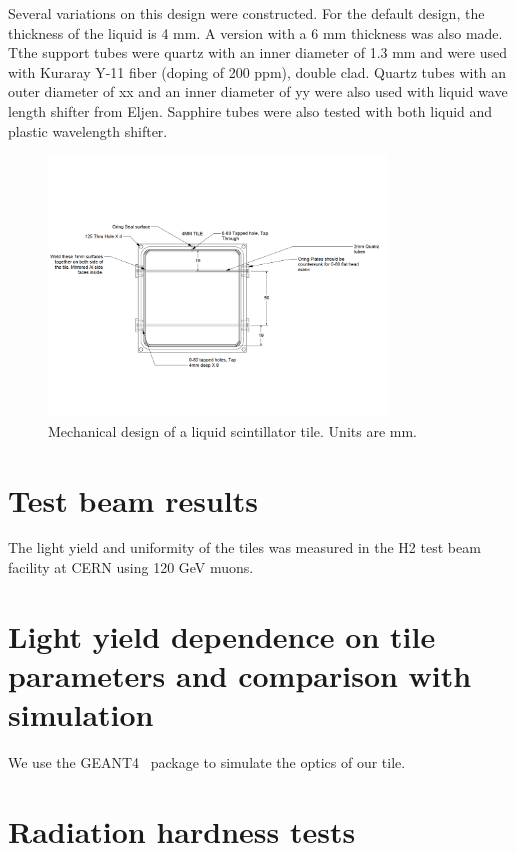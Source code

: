 \documentclass[review]{elsarticle}
\begin{document}
Several variations on this design were constructed.  For the default design, the thickness of the liquid is 4 mm.  A version with a 6 mm thickness was also made.  Tthe support tubes were quartz with an inner diameter of 1.3 mm and were used with Kuraray Y-11 fiber (doping of 200 ppm), double clad.  Quartz tubes with an outer diameter of xx and an inner diameter of yy were also used with liquid wave length shifter from Eljen.
Sapphire tubes were also tested with both liquid and plastic wavelength shifter.


\begin{figure}[!ht]
\begin{center}
\includegraphics[width=0.8\textwidth]{mechanicaldesign.pdf}
\caption{
Mechanical design of a liquid scintillator tile.  Units are mm.
}
\label{fig:tiledesign}
\end{center}
\end{figure}



\section{Test beam results}

The light yield and uniformity of the tiles was measured in the H2 test beam facility at CERN using 120 GeV muons.

\section{Light yield dependence on tile parameters and comparison with simulation}
We use the GEANT4~\cite{Agostinelli2003250} package to simulate the optics of our tile.  

\section{Radiation hardness tests}
\end{document}

